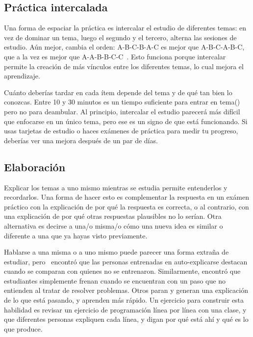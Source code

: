 \subsection*{Práctica intercalada}

Una forma de espaciar la práctica es intercalar el estudio de diferentes temas:
en vez de dominar un tema,
luego el segundo y el tercero,
alterna las sesiones de estudio.
Aún mejor,
cambia el orden:
A-B-C-B-A-C es mejor que A-B-C-A-B-C,
que a la vez es mejor que A-A-B-B-C-C~\cite{Rohr2015}.
Esto funciona porque intercalar permite la creación de más vínculos entre los diferentes temas,
lo cual mejora el aprendizaje.

Cuánto deberías tardar en cada ítem
depende del tema y de qué tan bien lo conozcas.
Entre 10 y 30 minutos es un tiempo suficiente para
entrar en tema()
pero no para deambular.
Al principio, intercalar el estudio parecerá más difícil que enfocarse en un único tema,
pero ese es un signo de que está funcionando.
Si usas tarjetas de estudio o haces exámenes de práctica para medir tu progreso,
deberías ver una mejora después de un par de días.

\subsection*{Elaboración}

Explicar los temas a uno mismo mientras se estudia
permite entenderlos y recordarlos.
Una forma de hacer esto es complementar la respuesta en un exámen práctico
con la explicación de por qué la respuesta es correcta,
o al contrario, con una explicación de por qué otras respuestas plausibles no lo serían.
Otra alternativa es decirse a una/o misma/o
cómo una nueva idea es similar o diferente a una que ya hayas visto previamente.

Hablarse a una misma o a uno mismo puede parecer una forma extraña de estudiar,
pero~\cite{Biel1995} encontró que
las personas entrenadas en auto-explicarse destacan cuando se comparan con quienes no se entrenaron.
Similarmente,
\cite{Chi1989} encontró que estudiantes simplemente frenan cuando se encuentran con un paso que no entienden
al tratar de resolver problemas.
Otros paran y generan una explicación de lo que está pasando,
y aprenden más rápido.
Un ejercicio para construir esta habilidad es revisar un ejercicio de programación línea por línea con una clase,
y que diferentes personas expliquen cada línea,
y digan por qué está ahí y qué es lo que produce.


